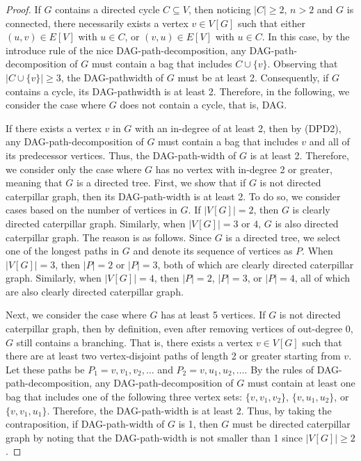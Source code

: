 \documentclass[runningheads]{llncs}
\theoremstyle{plain}
\theoremstyle{definition}
\begin{document}
\begin{proof}
    If $G$ contains a directed cycle $C \subseteq V$, then noticing $|C| \geq 2$, $n > 2$ and $G$ is connected, there necessarily exists a vertex $v \in V[G]$ such that either $(u, v) \in E[V]$ with $u \in C$, or $(v, u) \in E[V]$ with $u \in C$. In this case, by the introduce rule of the nice DAG-path-decomposition, any DAG-path-decomposition of $G$ must contain a bag that includes $C \cup \{v\}$. Observing that $|C \cup \{v\}| \geq 3$, the DAG-pathwidth of $G$ must be at least 2. Consequently, if $G$ contains a cycle, its DAG-pathwidth is at least 2. Therefore, in the following, we consider the case where $G$ does not contain a cycle, that is, DAG.

    If there exists a vertex $v$ in $G$ with an in-degree of at least 2, then by (DPD2), any DAG-path-decomposition of $G$ must contain a bag that includes $v$ and all of its predecessor vertices. Thus, the DAG-path-width of $G$ is at least 2. Therefore, we consider only the case where $G$ has no vertex with in-degree 2 or greater, meaning that $G$ is a directed tree. First, we show that if $G$ is not directed caterpillar graph, then its DAG-path-width is at least 2. To do so, we consider cases based on the number of vertices in $G$. If $|V[G]| = 2$, then $G$ is clearly directed caterpillar graph. Similarly, when $|V[G]| = 3$ or $4$, $G$ is also directed caterpillar graph. The reason is as follows. Since $G$ is a directed tree, we select one of the longest paths in $G$ and denote its sequence of vertices as $P$. When $|V[G]| = 3$, then $|P| = 2$ or $|P| = 3$, both of which are clearly directed caterpillar graph. Similarly, when $|V[G]| = 4$, then $|P| = 2$, $|P| = 3$, or $|P| = 4$, all of which are also clearly directed caterpillar graph.
    
    Next, we consider the case where $G$ has at least 5 vertices. If $G$ is not directed caterpillar graph, then by definition, even after removing vertices of out-degree 0, $G$ still contains a branching. That is, there exists a vertex $v \in V[G]$ such that there are at least two vertex-disjoint paths of length 2 or greater starting from $v$. Let these paths be $P_1 = v, v_1, v_2, \dots$ and $P_2 = v, u_1, u_2, \dots$. By the rules of DAG-path-decomposition, any DAG-path-decomposition of $G$ must contain at least one bag that includes one of the following three vertex sets: $\{v, v_1, v_2\}$, $\{v, u_1, u_2\}$, or $\{v, v_1, u_1\}$. Therefore, the DAG-path-width is at least 2. Thus, by taking the contraposition, if DAG-path-width of $G$ is 1, then $G$ must be directed caterpillar graph by noting that the DAG-path-width is not smaller than 1 since $|V[G]| \geq 2$.
    

\end{proof}
\end{document}

